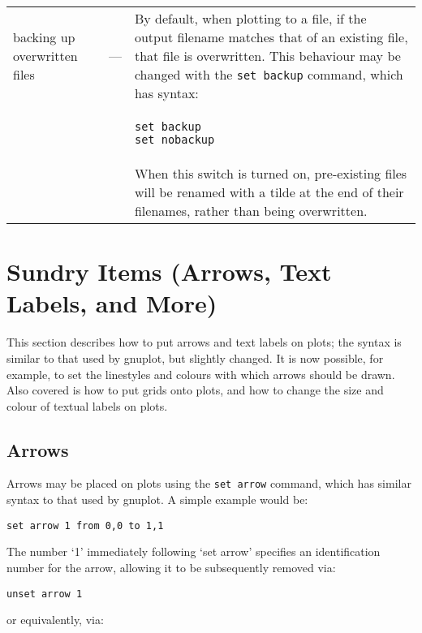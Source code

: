 \documentclass[a4paper,onecolumn,11pt]{book}
\begin{document}
\begin{longtable}{p{3cm}lp{9cm}}
backing up overwritten files\index{set backup command@\texttt{set backup}
command}\index{overwriting files}\index{backup files}\label{filebackup} & ---
& By default, when plotting to a file, if the output filename matches that of
an existing file, that file is overwritten. This behaviour may be changed with
the \texttt{set backup} command, which has syntax:
\\ & &
\begin{verbatim}
set backup
set nobackup
\end{verbatim}
\\ & &
When this switch is turned on, pre-existing files will be renamed with a tilde at the end of their filenames, rather than being overwritten. \\

\end{longtable}

\section{Sundry Items (Arrows, Text Labels, and More)}

This section describes how to put arrows and text labels on plots; the syntax
is similar to that used by gnuplot, but slightly changed. It is now possible,
for example, to set the linestyles and colours with which arrows should be
drawn.  Also covered is how to put grids onto plots, and how to change the size
and colour of textual labels on plots.

\subsection{Arrows}

\label{set_arrow} Arrows may be placed on plots using the \texttt{set arrow} command,
which has similar syntax to that used by gnuplot. A simple example would be:

\begin{verbatim}
set arrow 1 from 0,0 to 1,1
\end{verbatim}

\noindent The number `1' immediately following `set arrow' specifies an identification
number for the arrow, allowing it to be subsequently removed via:

\begin{verbatim}
unset arrow 1
\end{verbatim}

\noindent or equivalently, via:
\end{document}
